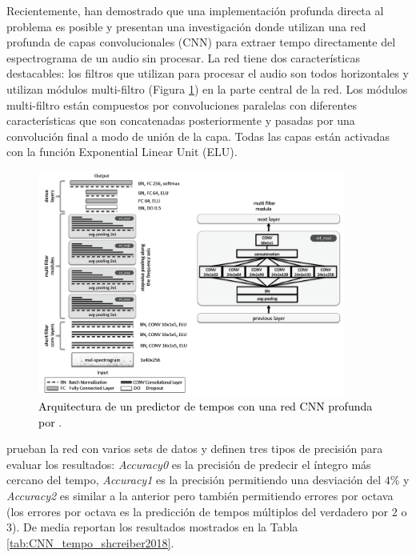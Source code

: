 Recientemente, \cite{Schreiber:2018} han demostrado que una implementación profunda directa al problema es posible y presentan una investigación donde utilizan una red profunda de capas convolucionales (CNN) para extraer tempo directamente del espectrograma de un audio sin procesar. La red tiene dos características destacables: los filtros que utilizan para procesar el audio son todos horizontales y utilizan módulos multi-filtro (Figura \ref{Fig:system_architecture_Schreiber2018}) en la parte central de la red. Los módulos multi-filtro están compuestos por convoluciones paralelas con diferentes características que son concatenadas posteriormente y pasadas por una convolución final a modo de unión de la capa. Todas las capas están activadas con la función Exponential Linear Unit (ELU).

\begin{figure}[htb]
  \centering
  \includegraphics[width=0.9\textwidth]{Figures/system_architecture_Schreiber2018.png}
  \caption{\textcolor{black}{Arquitectura de un predictor de tempos con una red CNN profunda por \cite{Schreiber:2018}}.}
  \label{Fig:system_architecture_Schreiber2018}
\end{figure}

\cite{Schreiber:2018} prueban la red con varios sets de datos y definen tres tipos de precisión para evaluar los resultados: \textit{Accuracy0} es la precisión de predecir el íntegro más cercano del tempo, \textit{Accuracy1} es la precisión permitiendo una desviación del $4\%$ y \textit{Accuracy2} es similar a la anterior pero también permitiendo errores por octava (los errores por octava es la predicción de tempos múltiplos del verdadero por 2 o 3). De media reportan los resultados mostrados en la Tabla \ref{tab:CNN_tempo_shcreiber2018}.

